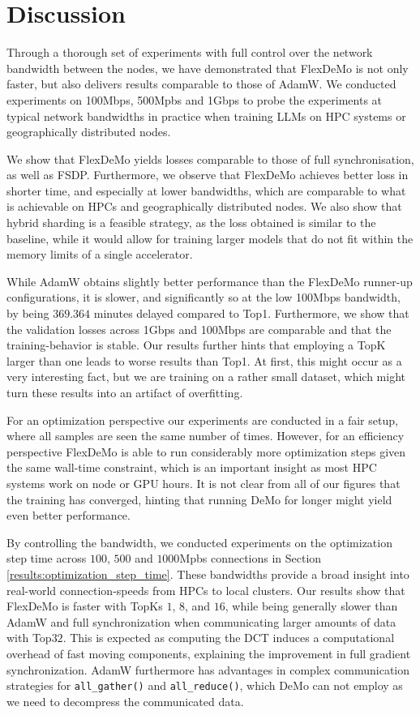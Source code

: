 \section{Discussion}
Through a thorough set of experiments with full control over the network bandwidth between the nodes, we have demonstrated that FlexDeMo is not only faster, but also delivers results comparable to those of AdamW. We conducted experiments on 100Mbps, 500Mpbs and 1Gbps to probe the experiments at typical network bandwidths in practice when training LLMs on HPC systems or geographically distributed nodes. 

We show that FlexDeMo yields losses comparable to those of full synchronisation, as well as FSDP. Furthermore, we observe that FlexDeMo achieves better loss in shorter time, and especially at lower bandwidths, which are comparable to what is achievable on HPCs and geographically distributed nodes. We also show that hybrid sharding is a feasible strategy, as the loss obtained is similar to the baseline, while it would allow for training larger models that do not fit within the memory limits of a single accelerator.

While AdamW obtains slightly better performance than the FlexDeMo runner-up configurations, it is slower, and significantly so at the low 100Mbps bandwidth, by being $369.364$ minutes delayed compared to Top1. Furthermore, we show that the validation losses across 1Gbps and 100Mbps are comparable and that the training-behavior is stable.
Our results further hints that employing a TopK larger than one leads to worse results than Top1. At first, this might occur as a very interesting fact, but we are training on a rather small dataset, which might turn these results into an artifact of overfitting.

For an optimization perspective our experiments are conducted in a fair setup, where all samples are seen the same number of times. However, for an efficiency perspective FlexDeMo is able to run considerably more optimization steps given the same wall-time constraint, which is an important insight as most HPC systems work on node or GPU hours. It is not clear from all of our figures that the training has converged, hinting that running DeMo for longer might yield even better performance.

By controlling the bandwidth, we conducted experiments on the optimization step time across $100$, $500$ and $1000$Mpbs connections in Section \ref{results:optimization_step_time}. These bandwidths provide a broad insight into real-world connection-speeds from HPCs to local clusters. Our results show that FlexDeMo is faster with TopKs $1$, $8$, and $16$, while being generally slower than AdamW and full synchronization when communicating larger amounts of data with Top$32$. This is expected as computing the DCT induces a computational overhead of fast moving components, explaining the improvement in full gradient synchronization. AdamW furthermore has advantages in complex communication strategies for \texttt{all\_gather()} and \texttt{all\_reduce()}, which DeMo can not employ as we need to decompress the communicated data. 


